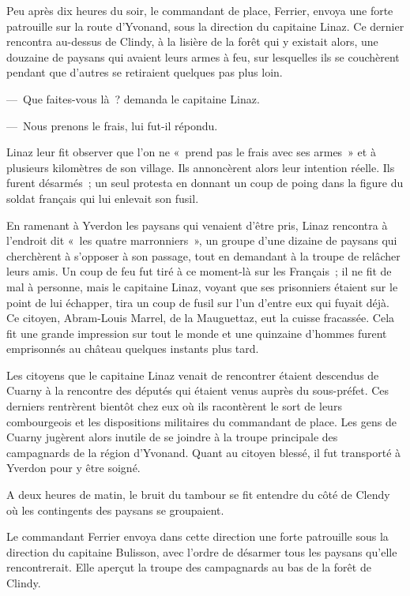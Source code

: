 \documentclass[french,twoside]{book} %
\begin{document}
Peu après dix heures du soir, le commandant de place, Ferrier, envoya une forte patrouille sur la route d’Yvonand, sous la direction du capitaine Linaz. Ce dernier rencontra au-dessus de Clindy, à la lisière de la forêt qui y existait alors, une douzaine de paysans qui avaient leurs armes à feu, sur lesquelles ils se couchèrent pendant que d’autres se retiraient quelques pas plus loin.\par
— Que faites-vous là ? demanda le capitaine Linaz.\par
— Nous prenons le frais, lui fut-il répondu.\par
Linaz leur fit observer que l’on ne « prend pas le frais avec ses armes » et à plusieurs kilomètres de son village. Ils annoncèrent alors leur intention réelle. Ils furent désarmés ; un seul protesta en donnant un coup de poing dans la figure du soldat français qui lui enlevait son fusil.\par
En ramenant à Yverdon les paysans qui venaient d’être pris, Linaz rencontra à l’endroit dit « les quatre marronniers », un groupe d’une dizaine de paysans qui cherchèrent à s’opposer à son passage, tout en demandant à la troupe de relâcher leurs amis. Un coup de feu fut tiré à ce moment-là sur les Français ; il ne fit de mal à personne, mais le capitaine Linaz, voyant que ses prisonniers étaient sur le point de lui échapper, tira un coup de fusil sur l’un d’entre eux qui fuyait déjà. Ce citoyen, Abram-Louis Marrel, de la Mauguettaz, eut la cuisse fracassée. Cela fit une grande impression sur tout le monde et une quinzaine d’hommes furent emprisonnés au château quelques instants plus tard.\par
Les citoyens que le capitaine Linaz venait de rencontrer étaient descendus de Cuarny à la rencontre des députés qui étaient venus auprès du sous-préfet. Ces derniers rentrèrent bientôt chez eux où ils racontèrent le sort de leurs combourgeois et les dispositions militaires du commandant de place. Les gens de Cuarny jugèrent alors inutile de se joindre à la troupe principale des campagnards de la région d’Yvonand. Quant au citoyen blessé, il fut transporté à Yverdon pour y être soigné.\par
A deux heures de matin, le bruit du tambour se fit entendre du côté de Clendy où les contingents des paysans se groupaient.\par
Le commandant Ferrier envoya dans cette direction une forte patrouille sous la direction du capitaine Bulisson, avec l’ordre de désarmer tous les paysans qu’elle rencontrerait. Elle aperçut la troupe des campagnards au bas de la forêt de Clindy.\par
\end{document}
